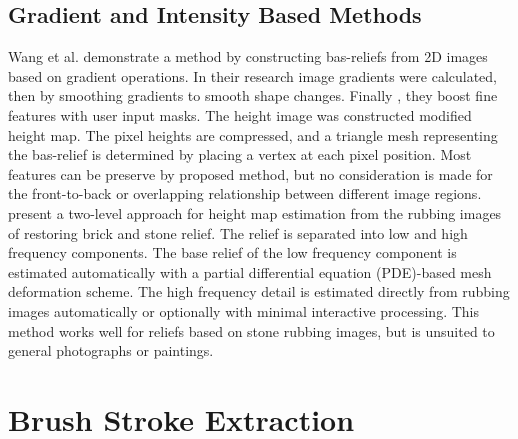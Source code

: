 \subsection{Gradient and Intensity Based Methods}
Wang et al.\cite{wang2010image} demonstrate a method by constructing bas-reliefs from 2D images based on gradient operations. In their research image gradients were calculated, then by smoothing gradients to smooth shape changes. Finally , they boost fine features with user input masks.
The height image was constructed modified height map. The pixel heights are compressed, and a triangle mesh representing the bas-relief is determined by placing a vertex at each pixel position. Most features can be preserve by proposed method, but no consideration is made for the front-to-back or overlapping relationship between different image regions. \newline
\cite{li2012restoration} present a two-level approach for height map estimation from the rubbing images of restoring brick and stone relief.  The relief is separated into low and high frequency components. The base relief of the low frequency component is estimated automatically with a partial differential equation (PDE)-based mesh deformation scheme. The high frequency detail is estimated directly from rubbing images automatically or optionally with minimal interactive processing. This method works well for reliefs based on stone rubbing images, but is unsuited to general photographs or paintings.

\section{Brush Stroke Extraction}\label{sectionbss}

